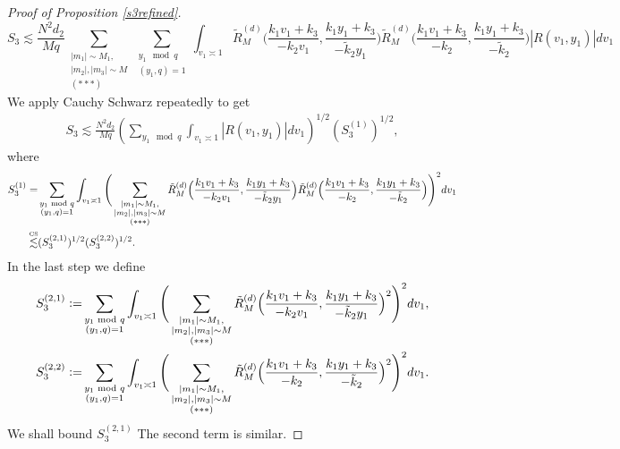\begin{proof}[Proof of Proposition \ref{s3refined}]
    
    \[
    S_3\lesssim \frac{N^2d_2}{Mq} \sum_{\substack{|m_1|\sim M_1,\\|m_2|,|m_3|\sim M\\
        (***)}}\sum_{\substack{y_1\mod q\\ (y_1,q)=1} }\int_{v_1\asymp 1}
        \tilde{R}_M^{(d)}\Big(\frac{k_1v_1+k_3}{-k_2v_1},\frac{k_1y_1+k_3}{-\tilde{k}_2y_1}\Big)\tilde{R}_M^{(d)}\Big(\frac{k_1v_1+k_3}{-k_2},\frac{k_1y_1+k_3}{-\tilde{k}_2}\Big)|R\left(v_1,y_1\right)| dv_1
    \]
    We apply Cauchy Schwarz repeatedly to get \begin{align*}
        S_3\lesssim \frac{N^2d_2}{Mq} (\sum_{y_1\mod q}\int_{v_1\asymp 1}|R\left(v_1,y_1\right)| dv_1)^{1/2} (S_3^{(1)})^{1/2},
    \end{align*}
    where \begin{align*}
        S_3^{(1)}=&\sum_{\substack{y_1\mod q\\ (y_1,q)=1} }\int_{v_1\asymp 1}\Bigg(\sum_{\substack{|m_1|\sim M_1,\\|m_2|,|m_3|\sim M\\
        (***)}}
        \tilde{R}_M^{(d)}\Big(\frac{k_1v_1+k_3}{-k_2v_1},\frac{k_1y_1+k_3}{-\tilde{k}_2y_1}\Big)\tilde{R}_M^{(d)}\Big(\frac{k_1v_1+k_3}{-k_2},\frac{k_1y_1+k_3}{-\tilde{k}_2}\Big)\Bigg)^2 dv_1\\
        \stackon{CS}{\lesssim}& ( S_3^{(2,1)} )^{1/2}( S_3^{(2,2)} )^{1/2}.
    \end{align*}
    In the last step we define \begin{align*}
        S_3^{(2,1)}\mathrel{\mathop:}=&\sum_{\substack{y_1\textrm{ mod } q\\ (y_1,q)=1} }\int_{v_1\asymp 1}\Bigg(\sum_{\substack{|m_1|\sim M_1,\\|m_2|,|m_3|\sim M\\
        (***)}}
        \tilde{R}_M^{(d)}\Big(\frac{k_1v_1+k_3}{-k_2v_1},\frac{k_1y_1+k_3}{-\tilde{k}_2y_1}\Big)^2\Bigg)^2 dv_1,
        \\
        S_3^{(2,2)}\mathrel{\mathop:}=&\sum_{\substack{y_1\textrm{ mod } q\\ (y_1,q)=1} }\int_{v_1\asymp 1}\Bigg(\sum_{\substack{|m_1|\sim M_1,\\|m_2|,|m_3|\sim M\\
        (***)}}
       \tilde{R}_M^{(d)}\Big(\frac{k_1v_1+k_3}{-k_2},\frac{k_1y_1+k_3}{-\tilde{k}_2}\Big)^2\Bigg)^2 dv_1.
    \end{align*}
    We shall bound $ S_3^{(2,1)}$ The second term is similar. 

\end{proof}
